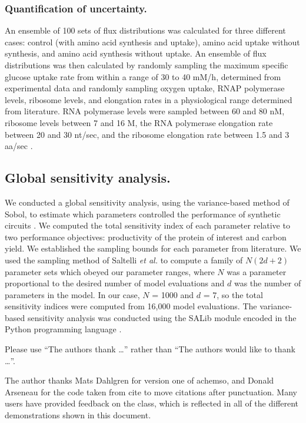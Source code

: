 \documentclass[journal=asbcd6,manuscript=article]{achemso}
\begin{document}
\subsubsection*{Quantification of uncertainty.}
An ensemble of 100 sets of flux distributions was calculated for three different cases: control (with amino acid synthesis and uptake), amino acid uptake without synthesis, and amino acid synthesis without uptake.
An ensemble of flux distributions was then calculated by randomly sampling the maximum specific glucose uptake rate from within a range of 30 to 40 mM/h, determined from experimental data and randomly sampling oxygen uptake, RNAP polymerase levels, ribosome levels, and elongation rates in a physiological range determined from literature.
RNA polymerase levels were sampled between 60 and 80 nM, ribosome levels between 7 and 16 \textmu M, the RNA polymerase elongation rate between 20 and 30 nt/sec, and the ribosome elongation rate between 1.5 and 3 aa/sec \cite{2005_underwood_biotech, Garamella:2016aa}.

\subsection*{Global sensitivity analysis.}
We conducted a global sensitivity analysis, using the variance-based method of Sobol, to estimate which parameters controlled the performance of synthetic circuits \citep{SOBOL_METHOD}.
We computed the total sensitivity index of each parameter relative to two performance objectives: productivity of the protein of interest and carbon yield.
We established the sampling bounds for each parameter from literature.
We used the sampling method of Saltelli \textit{et al.} \citep{Saltelli:2010} to compute a family of $N\left(2d+2\right)$ parameter sets which obeyed our parameter ranges,
where $N$ was a parameter proportional to the desired number of model evaluations and $d$ was the number of parameters in the model. In our case, $N$ = 1000 and $d$ = 7, so the total sensitivity indices were computed from 16,000 model evaluations. The variance-based sensitivity analysis was conducted using the SALib module encoded in the Python programming language \citep{SALIB}.

\begin{acknowledgement}

Please use ``The authors thank \ldots'' rather than ``The
authors would like to thank \ldots''.

The author thanks Mats Dahlgren for version one of \textsf{achemso},
and Donald Arseneau for the code taken from \textsf{cite} to move
citations after punctuation. Many users have provided feedback on the
class, which is reflected in all of the different demonstrations
shown in this document.

\end{acknowledgement}
\end{document}
